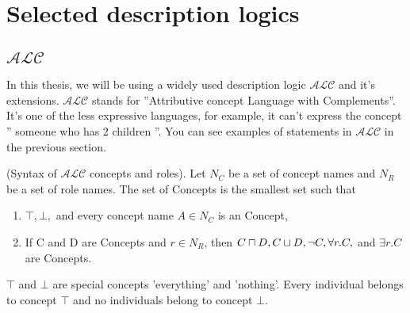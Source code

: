 \section{Selected description logics}

\subsection{$\mathcal{ALC}$}
In this thesis, we will be using a widely used description logic $\mathcal{ALC}$ and it's extensions.
$\mathcal{ALC}$ stands for ''Attributive concept Language with Complements''. It's one of the less expressive languages, for example, it can't express the concept '' someone who has 2 children ''.
You can see examples of statements in $\mathcal{ALC}$ in the previous section. 
\begin{mydef} 
\label{ALCsyntax}
\cite{handbook2}
(Syntax of $\mathcal{ALC}$ concepts and roles). Let $N_C$ be a set of concept names and $N_R$ be a set of
role names. The set of Concepts is the smallest set such that
\begin{enumerate}
\item $ \top, \bot,$ and every concept name $A \in N_C$ is an Concept,
\item  If C and D are Concepts and $r \in N_R$, then $C \sqcap D,\\ C \sqcup D , \neg C, \forall r.C,$ and $\exists r.C$ are Concepts.
\end{enumerate}
\end{mydef}
$\top$ and $\bot$ are special concepts 'everything' and 'nothing'. Every individual belongs to concept $\top$ and no individuals belong to concept $\bot$.\\

